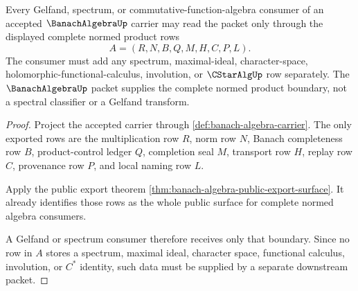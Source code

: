 \begin{theorem}
\label{thm:banach-algebra-gelfand-spectrum-dependency-boundary}
Every Gelfand, spectrum, or commutative-function-algebra consumer of an accepted $\BanachAlgebraUp$ carrier may read the packet only through the displayed complete normed product rows
$$
A=(R,N,B,Q,M,H,C,P,L).
$$
The consumer must add any spectrum, maximal-ideal, character-space, holomorphic-functional-calculus, involution, or $\CStarAlgUp$ row separately. The $\BanachAlgebraUp$ packet supplies the complete normed product boundary, not a spectral classifier or a Gelfand transform.
\end{theorem}
\begin{proof}
Project the accepted carrier through \autoref{def:banach-algebra-carrier}. The only exported rows are the multiplication row $R$, norm row $N$, Banach completeness row $B$, product-control ledger $Q$, completion seal $M$, transport row $H$, replay row $C$, provenance row $P$, and local naming row $L$.

Apply the public export theorem \autoref{thm:banach-algebra-public-export-surface}. It already identifies those rows as the whole public surface for complete normed algebra consumers.

A Gelfand or spectrum consumer therefore receives only that boundary. Since no row in $A$ stores a spectrum, maximal ideal, character space, functional calculus, involution, or $C^*$ identity, such data must be supplied by a separate downstream packet.
\end{proof}


